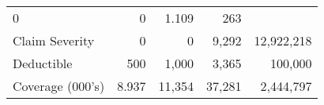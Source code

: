 \documentclass[]{book}
\theoremstyle{definition}
\theoremstyle{definition}
\theoremstyle{definition}
\theoremstyle{remark}
\begin{document}
\begin{longtable}[]{@{}lrrrr@{}}
\begin{minipage}[t]{0.12\columnwidth}
0\strut
\end{minipage} & \begin{minipage}[t]{0.11\columnwidth}\raggedleft\strut
0\strut
\end{minipage} & \begin{minipage}[t]{0.12\columnwidth}\raggedleft\strut
1.109\strut
\end{minipage} & \begin{minipage}[t]{0.14\columnwidth}\raggedleft\strut
263\strut
\end{minipage}\tabularnewline
\begin{minipage}[t]{0.23\columnwidth}\raggedright\strut
Claim Severity\strut
\end{minipage} & \begin{minipage}[t]{0.12\columnwidth}\raggedleft\strut
0\strut
\end{minipage} & \begin{minipage}[t]{0.11\columnwidth}\raggedleft\strut
0\strut
\end{minipage} & \begin{minipage}[t]{0.12\columnwidth}\raggedleft\strut
9,292\strut
\end{minipage} & \begin{minipage}[t]{0.14\columnwidth}\raggedleft\strut
12,922,218\strut
\end{minipage}\tabularnewline
\begin{minipage}[t]{0.23\columnwidth}\raggedright\strut
Deductible\strut
\end{minipage} & \begin{minipage}[t]{0.12\columnwidth}\raggedleft\strut
500\strut
\end{minipage} & \begin{minipage}[t]{0.11\columnwidth}\raggedleft\strut
1,000\strut
\end{minipage} & \begin{minipage}[t]{0.12\columnwidth}\raggedleft\strut
3,365\strut
\end{minipage} & \begin{minipage}[t]{0.14\columnwidth}\raggedleft\strut
100,000\strut
\end{minipage}\tabularnewline
\begin{minipage}[t]{0.23\columnwidth}\raggedright\strut
Coverage (000's)\strut
\end{minipage} & \begin{minipage}[t]{0.12\columnwidth}\raggedleft\strut
8.937\strut
\end{minipage} & \begin{minipage}[t]{0.11\columnwidth}\raggedleft\strut
11,354\strut
\end{minipage} & \begin{minipage}[t]{0.12\columnwidth}\raggedleft\strut
37,281\strut
\end{minipage} & \begin{minipage}[t]{0.14\columnwidth}\raggedleft\strut
2,444,797\strut
\end{minipage}\tabularnewline
\bottomrule
\end{longtable}
\end{document}
